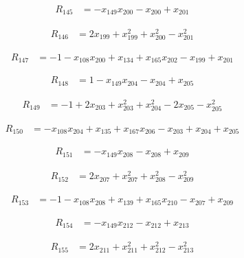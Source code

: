 \documentclass[11pt,letterpaper]{article}
\theoremstyle{definition}
\theoremstyle{remark}
\begin{document}
\begin{align*}
R_{145} &= -x_{149} x_{200} -x_{200} +x_{201}
\end{align*}

\begin{align*}
R_{146} &= 2 x_{199} +x_{199}^{2} +x_{200}^{2} -x_{201}^{2}
\end{align*}

\begin{align*}
R_{147} &= -1 -x_{108} x_{200} +x_{134} +x_{165} x_{202} -x_{199} +x_{201}
\end{align*}

\begin{align*}
R_{148} &= 1 -x_{149} x_{204} -x_{204} +x_{205}
\end{align*}

\begin{align*}
R_{149} &= -1 +2 x_{203} +x_{203}^{2} +x_{204}^{2} -2 x_{205} -x_{205}^{2}
\end{align*}

\begin{align*}
R_{150} &= -x_{108} x_{204} +x_{135} +x_{167} x_{206} -x_{203} +x_{204} +x_{205}
\end{align*}

\begin{align*}
R_{151} &= -x_{149} x_{208} -x_{208} +x_{209}
\end{align*}

\begin{align*}
R_{152} &= 2 x_{207} +x_{207}^{2} +x_{208}^{2} -x_{209}^{2}
\end{align*}

\begin{align*}
R_{153} &= -1 -x_{108} x_{208} +x_{139} +x_{165} x_{210} -x_{207} +x_{209}
\end{align*}

\begin{align*}
R_{154} &= -x_{149} x_{212} -x_{212} +x_{213}
\end{align*}

\begin{align*}
R_{155} &= 2 x_{211} +x_{211}^{2} +x_{212}^{2} -x_{213}^{2}
\end{align*}
\end{document}
